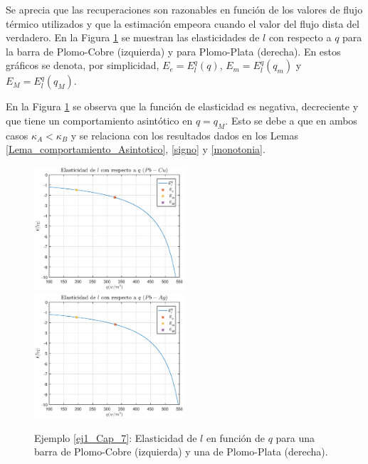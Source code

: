 %
Se aprecia que las recuperaciones son razonables en funci\'on de los valores de flujo t\'ermico utilizados y que la estimaci\'on empeora cuando el valor del flujo dista del verdadero.  
En la Figura \ref{Elast_1} se muestran las elasticidades de $l$ con respecto a $q$ para la barra de Plomo-Cobre (izquierda) y para Plomo-Plata (derecha). En estos gr\'aficos se 
denota, por simplicidad, $E_e=E_{l}^{q}(q)$, $E_m=E_{l}^{q}(q_m)$ y $E_M=E_{l}^{q}(q_M).$

En la Figura \ref{Elast_1} se observa que la funci\'on de elasticidad es negativa, decreciente y que tiene un comportamiento asint\'otico en $q=q_M$. Esto se debe a que 
en ambos casos $\kappa_A<\kappa_B$ y se relaciona con los resultados dados en los Lemas \ref{Lema_comportamiento_Asintotico}, \ref{signo} y \ref{monotonia}. 


%

\begin{figure}[!h]
\begin{center}
\includegraphics[width=0.495\textwidth]{7_Capitulo7/Graficos/Ejemplos/Ejemplo1/Elasticidad_Pb_Cu.eps}
\includegraphics[width=0.495\textwidth]{7_Capitulo7/Graficos/Ejemplos/Ejemplo1/Elasticidad_Pb_Ag.eps}
\vspace{-0.8cm} 
\caption{Ejemplo \ref{ej1_Cap_7}: Elasticidad de $l$ en funci\'on de $q$ para una barra de Plomo-Cobre (izquierda) y una de Plomo-Plata (derecha).}
\vspace{-0.8cm} 
\label{Elast_1}
\end{center}
\end{figure}

